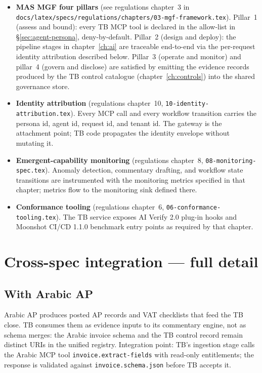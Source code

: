 \begin{itemize}
  \item \textbf{MAS MGF four pillars} (see regulations
    chapter~3 in
    \texttt{docs/latex/specs/regulations/chapters/03-mgf-framework.tex}).
    Pillar~1 (assess and bound): every TB MCP tool is declared in the
    allow-list in \S\ref{sec:agent-persona}, deny-by-default.
    Pillar~2 (design and deploy): the pipeline stages in
    chapter~\ref{ch:ai} are traceable end-to-end via the per-request
    identity attribution described below. Pillar~3 (operate and
    monitor) and pillar~4 (govern and disclose) are satisfied by
    emitting the evidence records produced by the TB control
    catalogue (chapter~\ref{ch:controls}) into the shared governance
    store.
  \item \textbf{Identity attribution} (regulations chapter~10,
    \texttt{10-identity-attribution.tex}). Every MCP call and every
    workflow transition carries the persona id, agent id, request id,
    and tenant id. The gateway is the attachment point; TB code
    propagates the identity envelope without mutating it.
  \item \textbf{Emergent-capability monitoring} (regulations
    chapter~8, \texttt{08-monitoring-spec.tex}). Anomaly detection,
    commentary drafting, and workflow state transitions are
    instrumented with the monitoring metrics specified in that
    chapter; metrics flow to the monitoring sink defined there.
  \item \textbf{Conformance tooling} (regulations chapter~6,
    \texttt{06-conformance-tooling.tex}). The TB service exposes
    AI Verify 2.0 plug-in hooks and Moonshot CI/CD 1.1.0 benchmark
    entry points as required by that chapter.
\end{itemize}

\section{Cross-spec integration --- full detail}
\label{sec:agent-integration}

\subsection{With Arabic AP}
Arabic AP produces posted AP records and VAT checklists that feed
the TB close. TB consumes them as evidence inputs to its commentary
engine, not as schema merges: the Arabic invoice schema and the TB
control record remain distinct URIs in the unified registry.
Integration point: TB's ingestion stage calls the Arabic MCP tool
\texttt{invoice.extract-fields} with read-only entitlements; the
response is validated against \texttt{invoice.schema.json} before TB
accepts it.

